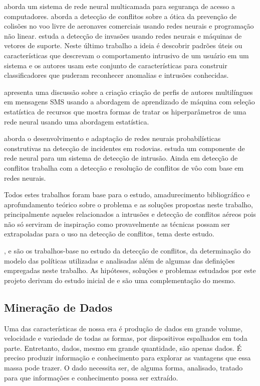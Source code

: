 \cite{obaidat_multilayer_1994} aborda um sistema de rede neural multicamada para segurança de acesso a computadores. \cite{christodoulou_collision_2008} aborda a detecção de conflitos sobre a ótica da prevenção de colisões no voo livre de aeronaves comerciais usando redes neurais e programação não linear. \cite{mukkamala_intrusion_2002} estuda a detecção de invasões usando redes neurais e máquinas de vetores de suporte. Neste último trabalho a ideia é descobrir padrões úteis ou características que descrevam o comportamento intrusivo de um usuário em um sistema e os autores usam este conjunto de características para construir classificadores que puderam reconhecer anomalias e intrusões conhecidas. 

\cite{thenmozhi_multi-lingual_2018} apresenta uma discussão sobre a criação criação de perfis de autores multilíngues em mensagens SMS usando a abordagem de aprendizado de máquina com seleção estatística de recursos que mostra formas de tratar os hiperparâmetros de uma rede neural usando uma abordagem estatística.

\cite{jin_development_2002} aborda o desenvolvimento e adaptação de redes neurais probabilísticas construtivas na detecção de incidentes em rodovias. \cite{debar_neural_1992} estuda um componente de rede neural para um sistema de detecção de intrusão. Ainda em detecção de conflitos \cite{chen_flight_2011} trabalha com a detecção e resolução de conflitos de vôo com base em redes neurais.

Todos estes trabalhos foram base para o estudo, amadurecimento bibliográfico e aprofundamento teórico sobre o problema e as soluções propostas neste trabalho, principalmente aqueles relacionados a intrusões e detecção de conflitos aéreos pois não só serviram de inspiração como provavelmente as técnicas possam ser extrapoladas para o uso na detecção de conflitos, tema deste estudo.

\cite{sarkis2017}, \cite{eduardo2017} e \cite{sarkis:artigo:2016} são os trabalhos-base no estudo da detecção de conflitos, da determinação do modelo das políticas utilizadas e analisadas além de algumas das definições empregadas neste trabalho. As hipóteses, soluções e problemas estudados por este projeto derivam do estudo inicial de \cite{sarkis2017} e são uma complementação do mesmo.

\subsection{Mineração de Dados}\label{mineracao_dados}
Uma das características de nossa era é produção de dados em grande volume, velocidade e variedade de todas as formas, por dispositivos espalhados em toda parte. Entretanto, dados, mesmo em grande quantidade, são apenas dados. É preciso produzir informação e conhecimento para explorar as vantagens que essa massa pode trazer. O dado necessita ser, de alguma forma, analisado, tratado para que informações e conhecimento possa ser extraído. \cite{aprenda_mineracao_fernando_amaral16} \cite{ferrari2017}

